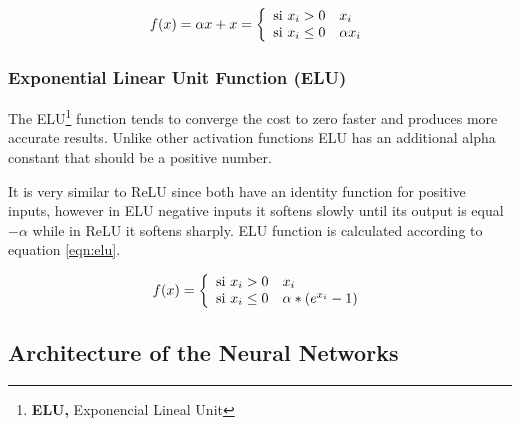 \begin{equation}
f(x) = \alpha x + x = \left\lbrace
\begin{array}{ll}
\textup{si } x_{i}>0 & x_{i}\\
\textup{si } x_{i} \leq 0 & \alpha x_{i}
\end{array}
\right.
\end{equation}

\subsubsection{Exponential Linear Unit Function (ELU)}

The ELU\footnote{\textbf{ELU, }Exponencial Lineal Unit} function tends to converge the cost to zero faster and produces more accurate results. Unlike other activation functions ELU has an additional alpha constant that should be a positive number.

\vspace{5mm} %

It is very similar to ReLU since both have an identity function for positive inputs, however in ELU negative inputs it softens slowly until its output is equal $-\alpha$ while in ReLU it softens sharply. ELU function is calculated according to equation \ref{eqn:elu}.

\begin{equation}
f(x) = \left\lbrace
\begin{array}{ll}
\textup{si } x_{i}>0 & x_{i}\\
\textup{si } x_{i} \leq 0 & \alpha *( e^{x_{i}}-1)
\end{array}
\right.
\label{eqn:elu}
\end{equation}

\subsection{Architecture of the Neural Networks}

